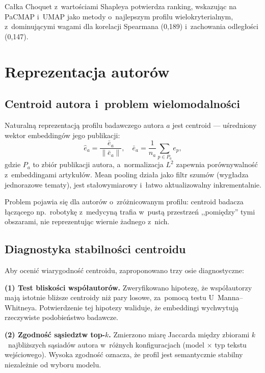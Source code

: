 \documentclass[a4paper,11pt,twocolumn]{article}
\begin{document}
Całka Choquet z~wartościami Shapleya potwierdza ranking, wskazując
na PaCMAP i~UMAP jako metody o~najlepszym profilu wielokryterialnym,
z~dominującymi wagami dla korelacji Spearmana (0,189) i~zachowania
odległości (0,147).


\section{Reprezentacja autorów}
\label{sec:author}

\subsection{Centroid autora i~problem wielomodalności}

Naturalną reprezentacją profilu badawczego autora $a$ jest centroid ---
uśredniony wektor embeddingów jego publikacji:
\begin{equation}
  \hat{e}_a = \frac{\bar{e}_a}{\|\bar{e}_a\|}, \quad
  \bar{e}_a = \frac{1}{n_a}\sum_{p \in P_a} e_p,
  \label{eq:centroid}
\end{equation}
gdzie $P_a$ to zbiór publikacji autora, a~normalizacja $L^2$
zapewnia porównywalność z~embeddingami artykułów. Mean pooling
działa jako filtr szumów (wygładza jednorazowe tematy), jest
stałowymiarowy i~łatwo aktualizowalny inkrementalnie.

Problem pojawia się dla autorów o~zróżnicowanym profilu: centroid
badacza łączącego np.~robotykę z~medycyną trafia w~pustą przestrzeń
,,pomiędzy'' tymi obszarami, nie reprezentując wiernie żadnego z~nich.

\subsection{Diagnostyka stabilności centroidu}

Aby ocenić wiarygodność centroidu, zaproponowano trzy osie diagnostyczne:

\textbf{(1) Test bliskości współautorów.}
Zweryfikowano hipotezę, że współautorzy mają istotnie bliższe centroidy
niż pary losowe, za~pomocą testu U~Manna--Whitneya. Potwierdzenie
tej hipotezy waliduje, że embeddingi wychwytują rzeczywiste podobieństwo
badawcze.

\textbf{(2) Zgodność sąsiedztw top-$k$.}
Zmierzono miarę Jaccarda między zbiorami $k$~najbliższych sąsiadów
autora w~różnych konfiguracjach (model $\times$ typ tekstu wejściowego).
Wysoka zgodność oznacza, że profil jest semantycznie stabilny niezależnie
od wyboru modelu.
\end{document}
